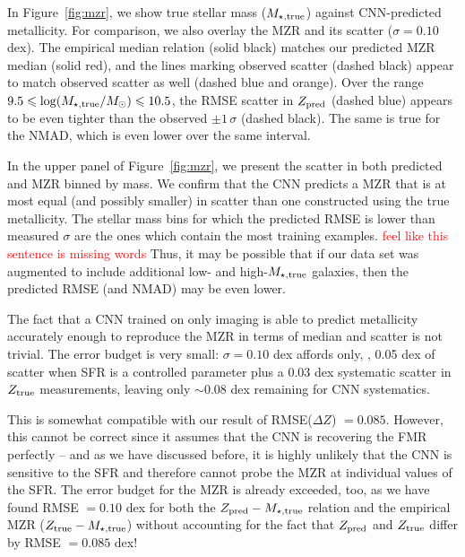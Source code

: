 \documentclass[fleqn,usenatbib]{mnras}
\newcommand{\editorial}[1]{\textcolor{red}{#1}}
\begin{document}
In Figure~\ref{fig:mzr}, we show true stellar mass ($M_{\star, \rm true}$) against CNN-predicted metallicity. For comparison, we also overlay the \cite{Tremonti2004} MZR and its scatter ($\sigma = 0.10$ dex). The empirical median relation (solid black) matches our predicted MZR median (solid red), and the lines marking observed scatter (dashed black) appear to match observed scatter as well (dashed blue and orange). Over the range $9.5 \leqslant \log (M_{\star, \rm true}/\hbox{$M_\odot$}) \leqslant 10.5$, the RMSE scatter in $Z_{\rm pred}$ (dashed blue) appears to be even tighter than the observed $\pm 1\,\sigma$ (dashed black). The same is true for the NMAD, which is even lower over the same interval.

In the upper panel of Figure~\ref{fig:mzr}, we present the scatter in both predicted and \cite{Tremonti2004} MZR binned by mass. We confirm that the CNN predicts a MZR that is at most equal (and possibly smaller) in scatter than one constructed using the true metallicity. The stellar mass bins for which the predicted RMSE is lower than measured $\sigma$ are the ones which contain the most training examples. \editorial{feel like this sentence is missing words} Thus, it may be possible that if our data set was augmented to include additional low- and high-$M_{\rm \star,true}$ galaxies, then the predicted RMSE (and NMAD) may be even lower.

The fact that a CNN trained on only \sdssi\sdssr\sdssg{} imaging is able to predict metallicity accurately enough to reproduce the MZR in terms of median and scatter is not trivial. The error budget is very small: $\sigma = 0.10$ dex affords only, \eg, 0.05 dex of scatter when SFR is a controlled parameter plus a 0.03 dex systematic scatter in $Z_{\rm true}$ measurements, leaving only $\sim 0.08$ dex remaining for CNN systematics.

This is somewhat compatible with our result of RMSE($\Delta Z$) $= 0.085$. However, this cannot be correct since it assumes that the CNN is recovering the FMR perfectly -- and as we have discussed before, it is highly unlikely that the CNN is sensitive to the SFR and therefore cannot probe the MZR at individual values of the SFR. The error budget for the MZR is already exceeded, too, as we have found RMSE $= 0.10$ dex for both the $Z_{\rm pred}-M_{\star,\rm true}$ relation and the empirical MZR ($Z_{\rm true}-M_{\star,\rm true}$) without accounting for the fact that $Z_{\rm pred}$ and $Z_{\rm true}$ differ by RMSE $= 0.085$ dex!
\end{document}
